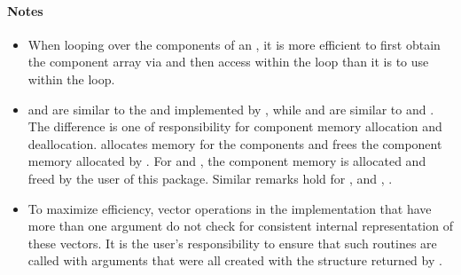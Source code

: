 \paragraph{\bf Notes}                                                      
           
\begin{itemize}
                                        
\item
  When looping over the components of an  , it is     
  more efficient to first obtain the component array via       
   and then access  within the     
  loop than it is to use  within the loop.        
                                     
\item                          
   and  are similar to the  and  
   implemented by {\nvecs}, while  and 
    are similar to   and . 
  The difference is one of responsibility for component memory     
  allocation and deallocation.  allocates memory  
  for the  components and  frees the     
  component memory allocated by . For    
  and , the component memory is allocated and      
  freed by the user of this package. Similar remarks hold for  
  ,   and ,              
  .                                            

\item
  To maximize efficiency, vector operations in the {\nvecs} implementation
  that have more than one  argument do not check for
  consistent internal representation of these vectors. It is the user's 
  responsibility to ensure that such routines are called with 
  arguments that were all created with the  structure returned
  by .

\end{itemize}
